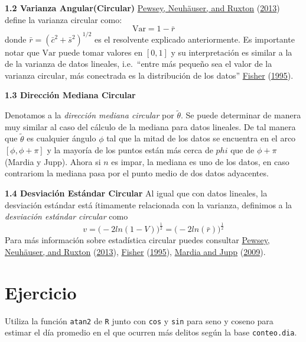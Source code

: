 \documentclass[
]{book}
\begin{document}
\textbf{1.2 Varianza Angular(Circular)}
\protect\hyperlink{ref-pewsey2013circular}{Pewsey, Neuhäuser, and Ruxton} (\protect\hyperlink{ref-pewsey2013circular}{2013}) define la varianza circular como:
\[
\textrm{Var} = 1 - \bar{r}
\]
donde \(\bar{r} = (\bar{c}^2 + \bar{s}^2)^{1/2}\) es el resolvente explicado anteriormente. Es importante notar que \(\textrm{Var}\) puede tomar valores en \([0,1]\) y su interpretación es similar a la de la varianza de datos lineales, i.e.~``entre más pequeño sea el valor de la varianza circular, más conectrada es la distribución de los datos'' \protect\hyperlink{ref-fisher1995statistical}{Fisher} (\protect\hyperlink{ref-fisher1995statistical}{1995}).

\textbf{1.3 Dirección Mediana Circular}

Denotamos a la \emph{dirección mediana circular} por \(\tilde{\theta}\). Se puede determinar de manera muy similar al caso del cálculo de la mediana para datos lineales. De tal manera que \(\tilde{\theta}\) es cualquier ángulo \(\phi\) tal que la mitad de los datos se encuentra en el arco \([\phi, \phi + \pi ]\) y la mayoría de los puntos están más cerca de \(phi\) que de \(\phi + \pi\) (Mardia y Jupp). Ahora si \(n\) es impar, la mediana es uno de los datos, en caso contrariom la mediana pasa por el punto medio de dos datos adyacentes.

\textbf{1.4 Desviación Estándar Circular}
Al igual que con datos lineales, la desviación estándar está ítimamente relacionada con la varianza, definimos a la \emph{desviación estándar circular} como
\[
v=\big(-2ln(1-V)\big)^{\frac{1}{2}}= \big(-2ln(\bar{r})\big)^{\frac{1}{2}}
\]
Para más información sobre estadística circular puedes consultar \protect\hyperlink{ref-pewsey2013circular}{Pewsey, Neuhäuser, and Ruxton} (\protect\hyperlink{ref-pewsey2013circular}{2013}), \protect\hyperlink{ref-fisher1995statistical}{Fisher} (\protect\hyperlink{ref-fisher1995statistical}{1995}), \protect\hyperlink{ref-mardia2009directional}{Mardia and Jupp} (\protect\hyperlink{ref-mardia2009directional}{2009}).

\hypertarget{ejercicio}{%
\section{Ejercicio}\label{ejercicio}}

Utiliza la función \texttt{atan2} de \texttt{R} junto con \texttt{cos} y \texttt{sin} para seno y coseno para estimar el día promedio en el que ocurren más delitos según la base \texttt{conteo.dia}.
\end{document}
